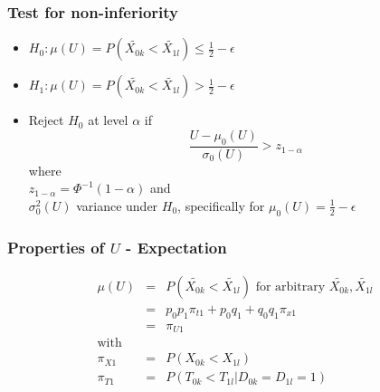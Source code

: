 \documentclass[xcolor=pdftex,dvipsnames,table]{beamer}\usepackage[]{graphicx}\usepackage[]{color}
\begin{document}
\begin{frame}[label = slide5] %
\frametitle{Test for non-inferiority}
\begin{itemize}
  \item $H_0:  
  \mu(U) = P(\tilde{X_{0k}} < \tilde{X_{1l}}) \leq \frac{1}{2} - \epsilon$ \\
  \item $H_1:  \mu(U) = P(\tilde{X_{0k}} < \tilde{X_{1l}}) > \frac{1}{2} - \epsilon $ \\
  \item Reject $H_0$ at level $\alpha$ if
        $$ \frac{U - \mu_0(U)}{\sigma_0(U)}  > z_{1-\alpha} $$ 
        where \\
        $z_{1-\alpha} = \Phi^{-1}({1-\alpha})$ and \\
        $\sigma_0^2(U)$  variance under $H_0$, specifically for 
        $ \mu_0(U) =  \frac{1}{2} - \epsilon$ 
\end{itemize}
\end{frame}



\begin{frame}[label = slide6] %
\frametitle{Properties of $U$ - Expectation}
\begin{eqnarray*}
  \mu(U) & = & P(\tilde{X_{0k}} < \tilde{X_{1l}})  \mbox{ for arbitrary } \tilde{X_{0k}}, \tilde{X_{1l}} \\
         & = & p_0 p_1 \pi_{t1} + p_0 q_1 + q_0 q_1 \pi_{x1} \\
         & = & \pi_{U1}\\
  \mbox{with}   &   & \\
  \pi_{X1} & = & P(X_{0k} < X_{1l}) \\
  \pi_{T1} & = & P(T_{0k} < T_{1l} | D_{0k} = D_{1l} = 1)
\end{eqnarray*}
\end{frame}
\end{document}
